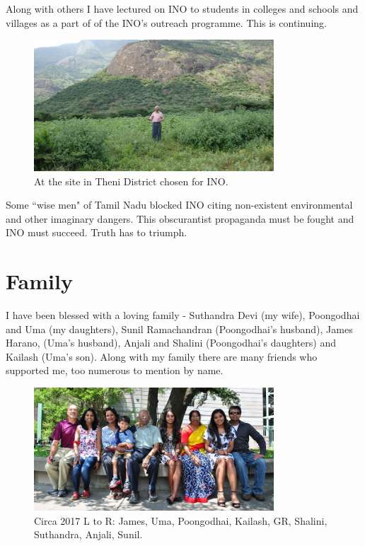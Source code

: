 Along with others I have lectured on INO to students in colleges and 
schools and villages as a part of of the INO's outreach programme. This 
is continuing.

\begin{figure}[h]
\centering
\includegraphics[width=0.8\textwidth]{images/Rajaji-ino.jpg}
\caption{\small{At the site in Theni District chosen for INO.}}
\end{figure}
  
Some ``wise men" of Tamil Nadu blocked INO citing non-exi\-stent 
environmental and other imaginary dangers. This obscurantist propaganda 
must be fought and INO must succeed. Truth has to triumph.


\vspace{-.3cm}

\section*{Family}

\vspace{-.2cm}

I have been blessed with a loving family - Suthandra Devi (my wife), 
Poongodhai and Uma (my daughters), Sunil Ramachandran (Poongodhai's 
husband), James Harano, (Uma's husband), Anjali and Shalini 
(Poongodhai's daughters) and Kailash (Uma's son).
Along with my family there are many friends who suppo\-rted me, too 
numerous to mention by name.


\begin{figure}[h]
\centering
\includegraphics[width=0.8\textwidth]{images/Rajaji-family-1.jpg}
\caption{\small{Circa 2017 L to R: James, Uma, Poongodhai, Kailash, GR, Shalini, Suthandra, Anjali, Sunil.}}
\end{figure}

